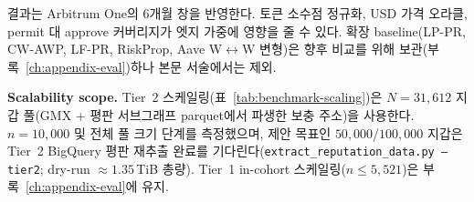 
결과는 Arbitrum One의 6개월 창을 반영한다. 토큰 소수점 정규화, USD 가격 오라클, permit 대 approve 커버리지가 엣지 가중에 영향을 줄 수 있다. 확장 baseline(LP-PR, CW-AWP, LF-PR, RiskProp, Aave W$\leftrightarrow$W 변형)은 향후 비교를 위해 보관(부록~\ref{ch:appendix-eval})하나 본문 서술에서는 제외.

\textbf{Scalability scope.} Tier~2 스케일링(표~\ref{tab:benchmark-scaling})은 $N=31{,}612$ 지갑 풀(GMX + 평판 서브그래프 parquet에서 파생한 보충 주소)을 사용한다. $n=10{,}000$ 및 전체 풀 크기 단계를 측정했으며, 제안 목표인 $50{,}000$/$100{,}000$ 지갑은 Tier~2 BigQuery 평판 재추출 완료를 기다린다(\texttt{extract\_reputation\_data.py --tier2}; dry-run $\approx 1.35$\,TiB 총량). Tier~1 in-cohort 스케일링($n \leq 5{,}521$)은 부록~\ref{ch:appendix-eval}에 유지.
